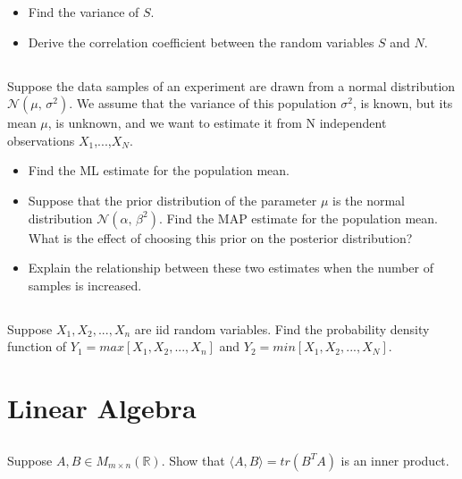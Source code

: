 \documentclass[a4paper]{article}
\begin{document}
        \begin{itemize}
        \item Find the variance of $S$.
        \end{itemize}
         
        \begin{itemize}
        \item Derive the correlation coefficient between the random variables $S$ and $N$.
        \end{itemize}

        \subsection{}
       Suppose the data samples of an experiment are drawn from a normal distribution $\mathcal{N}(\mu,\,\sigma^{2})$. We assume that the variance of this population $\sigma^{2}$, is known, but its mean $\mu$, is unknown, and we want to estimate it from N independent observations $X_{1}$,...,$X_{N}$.
        \begin{itemize}
        \item Find the ML estimate for the population mean.
        \item Suppose that the prior distribution of the parameter $\mu$ is the normal distribution $\mathcal{N}(\alpha,\,\beta^{2})$. Find the MAP estimate for the population mean. What is the effect of choosing this prior on the posterior distribution?
        \item Explain the relationship between these two estimates when the number of samples is increased.
        \end{itemize}

        \subsection{}
        Suppose $X_{1},X_{2},...,X_{n}$ are iid random variables. Find the probability density function of $Y_{1}=max[X_{1},X_{2},...,X_{n}]$ and
        $Y_{2}=min[X_{1},X_{2},...,X_{N}]$.
        
        \bigskip

        
        \section{Linear Algebra}
        
        \subsection{}
       Suppose $A, B\in M_{m\times n}(\mathbb{R})$. Show that $\langle A,B \rangle = tr(B^{T}A)$ is an inner product.
\end{document}
